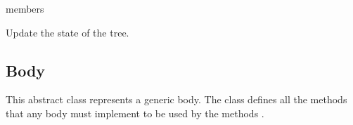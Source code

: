 \documentclass[letterpaper,10pt,english]{sphinxmanual}
\begin{document}
\begin{fulllineitems}
\begin{sphinxuseclass}{members}
\begin{description}

\begin{fulllineitems}
\label{\detokenize{bodytree:BodyTree.TreeUpdate}}
\pysigstartsignatures
{}
\pysigstopsignatures
\sphinxAtStartPar
Update the state of the tree.

\end{fulllineitems}


\end{description}

\end{sphinxuseclass}
\end{fulllineitems}


\sphinxstepscope


\subsection{Body}
\label{\detokenize{body:body}}\label{\detokenize{body::doc}}\label{\detokenize{body:module-classes}}
\sphinxAtStartPar
This abstract class represents a generic body. The class defines all the methods that any body must implement to be used by the methods {\hyperref[\detokenize{bodytree:BodyTree}]{}}.
\end{document}
